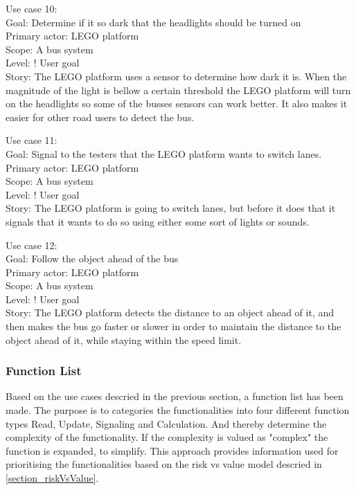 Use case 10:\\
Goal: Determine if it so dark that the headlights should be turned on\\
Primary actor: LEGO platform\\
Scope: A bus system\\
Level: ! User goal\\
Story: The LEGO platform uses a sensor to determine how dark it is. When the magnitude of the light is bellow a certain threshold the LEGO platform will turn on the headlights so some of the busses sensors can work better. It also makes it easier for other road users to detect the bus.

Use case 11:\\
Goal: Signal to the testers that the LEGO platform wants to switch lanes.\\
Primary actor: LEGO platform\\
Scope: A bus system\\
Level: ! User goal\\
Story: The LEGO platform is going to switch lanes, but before it does that it signals that it wants to do so using either some sort of lights or sounds.

Use case 12:\\
Goal: Follow the object ahead of the bus\\
Primary actor: LEGO platform\\
Scope: A bus system\\
Level: ! User goal\\
Story: The LEGO platform detects the distance to an object ahead of it, and then makes the bus go faster or slower in order to maintain the distance to the object ahead of it, while staying within the speed limit.

\subsubsection{Function List}
Based on the use cases descried in the previous section, a function list has been made. The purpose is to categories the functionalities into four different function types Read, Update, Signaling and Calculation\cite{OOD_FunctionTypes}. And thereby determine the complexity of the functionality. If the complexity is valued as "complex" the function is expanded, to simplify. This approach provides information used for prioritising the functionalities based on the risk vs value model descried in \ref{section_riskVsValue}.

